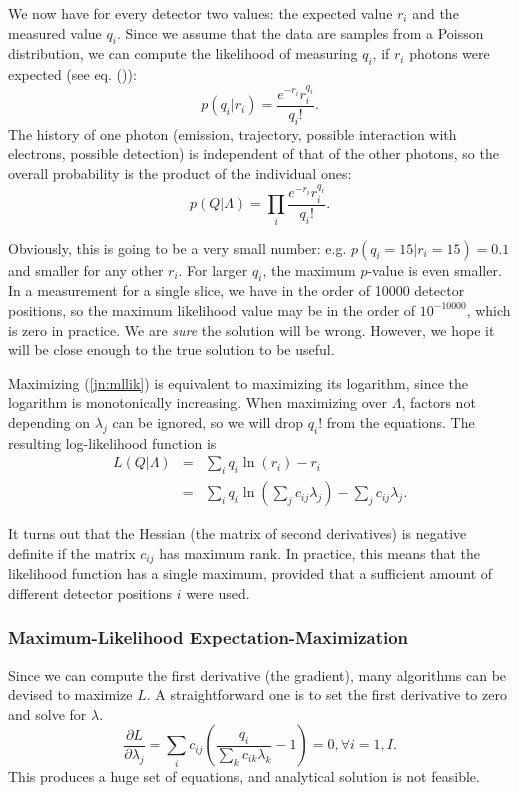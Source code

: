 We now have for every detector two values: the expected value $r_i$ and the
measured value $q_i$. Since we assume that the data are samples from a Poisson
distribution, we can compute the likelihood of measuring $q_i$, if $r_i$
photons were expected (see eq. ()):
\begin{equation}
  p(q_i | r_i) = \frac{e^{-r_i} r_i^{q_i}}{q_i!}.
\end{equation}
The history of one photon (emission, trajectory, possible interaction with
electrons, possible detection) is independent of that of the other photons, so
the overall probability is the product of the individual ones:
\begin{equation}
  p(Q | \Lambda) = \prod_i \frac{e^{-r_i} r_i^{q_i}}{q_i!}. \label{jn:mllik}
\end{equation}

Obviously, this is going to be a very small number: e.g. $p(q_i = 15 | r_i =
15) = 0.1$ and smaller for any other $r_i$. For larger $q_i$, the maximum
$p$-value is even smaller. In a measurement for a single slice, we have in the
order of 10000 detector positions, so the maximum likelihood value may be in
the order of $10^{-10000}$, which is zero in practice. We are {\em sure} the
solution will be wrong. However, we hope it will be close enough to the true
solution to be useful.

Maximizing (\ref{jn:mllik}) is equivalent to maximizing its logarithm, since
the logarithm is monotonically increasing. When maximizing over $\Lambda$,
factors not depending on $\lambda_j$ can be ignored, so we will drop $q_i!$
from the equations. The resulting log-likelihood function is
\begin{eqnarray}
  L(Q | \Lambda) & = & \sum_i q_i \ln(r_i) - r_i \\
        & = & \sum_i q_i \ln(\sum_j c_{ij} \lambda_j) - \sum_j c_{ij}
           \lambda_j. \label{eq:likelihood}
\end{eqnarray}

It turns out that the Hessian (the matrix of second derivatives) is negative
definite if the matrix $c_{ij}$ has maximum rank. In practice, this means that
the likelihood function has a single maximum, provided that a sufficient amount
of different detector positions $i$ were used.

\subsubsection{Maximum-Likelihood Expectation-Maximization}
Since we can compute the first derivative (the gradient), many algorithms can
be devised to maximize $L$. A straightforward one is to set the first
derivative to zero and solve for $\lambda$.
\begin{equation}
 \frac{\partial L}{\partial \lambda_j} = \sum_i c_{ij} \left(
      \frac{q_i}{\sum_k c_{ik} \lambda_k} - 1 \right) = 0, \forall i = 1,I.
       \label{eq:jnmlgrad}
\end{equation}
This produces a huge set of equations, and analytical solution is not
feasible.

